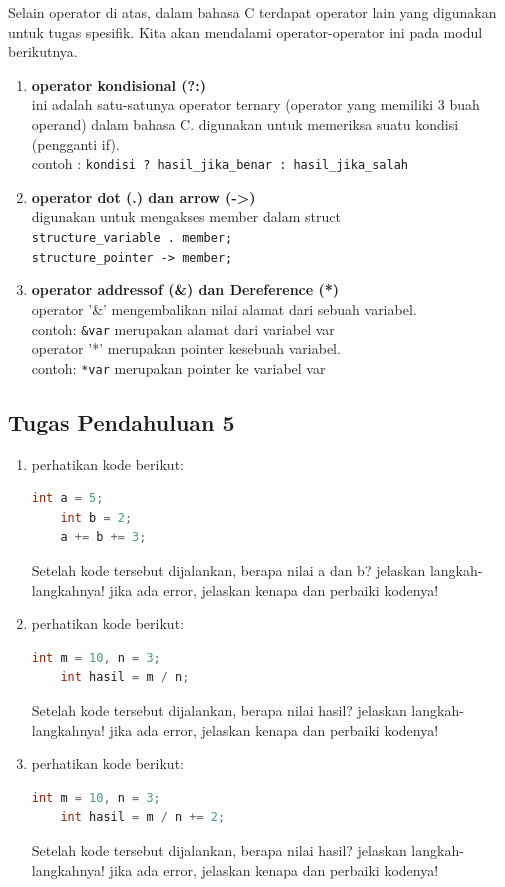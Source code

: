 Selain operator di atas, dalam bahasa C terdapat operator lain yang digunakan untuk tugas spesifik.
Kita akan mendalami operator-operator ini pada modul berikutnya.
\begin{enumerate}
	\item \textbf{operator kondisional (?:)} \\
	ini adalah satu-satunya operator ternary (operator yang memiliki 3 buah operand) dalam bahasa C.
	digunakan untuk memeriksa suatu kondisi (pengganti if). \\
	contoh : \verb|kondisi ? hasil_jika_benar : hasil_jika_salah|
	\item \textbf{operator dot (.) dan arrow (->)} \\
	digunakan untuk mengakses member dalam struct \\
	\verb|structure_variable . member;| \\
	\verb|structure_pointer -> member;|
	\item \textbf{operator addressof (\&) dan Dereference (*)} \\
	operator '\&' mengembalikan nilai alamat dari sebuah variabel. \\
	contoh: \verb|&var| merupakan alamat dari variabel var \\
	operator '*' merupakan pointer kesebuah variabel. \\
	contoh: \verb|*var| merupakan pointer ke variabel var
\end{enumerate}

\subsection*{Tugas Pendahuluan 5}
\begin{enumerate}
	\item perhatikan kode berikut:
	\begin{lstlisting}[language=c]
	int a = 5;
	int b = 2;
	a += b += 3;
\end{lstlisting}
    Setelah kode tersebut dijalankan, berapa nilai a dan b? jelaskan langkah-langkahnya! jika ada error, jelaskan kenapa dan perbaiki kodenya!
	\item perhatikan kode berikut:
	\begin{lstlisting}[language=c]
	int m = 10, n = 3;
	int hasil = m / n;
\end{lstlisting}
    Setelah kode tersebut dijalankan, berapa nilai hasil? jelaskan langkah-langkahnya! jika ada error, jelaskan kenapa dan perbaiki kodenya!
  	\item perhatikan kode berikut:
  	\begin{lstlisting}[language=c]
	int m = 10, n = 3;
	int hasil = m / n += 2;
\end{lstlisting}
    Setelah kode tersebut dijalankan, berapa nilai hasil? jelaskan langkah-langkahnya! jika ada error, jelaskan kenapa dan perbaiki kodenya!
\end{enumerate}

